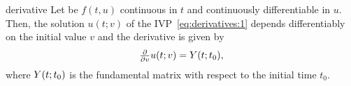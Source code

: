\begin{Theorem}{derivative}
   Let be $f(t,u)$ continuous in $t$ and
  continuously differentiable in $u$.  Then, the solution $u(t;v)$ of
  the IVP~\eqref{eq:derivatives:1} depends differentiably on the
  initial value $v$ and the derivative is given by
  \begin{gather}
    \label{eq:derivatives:5}
    \tfrac{\partial}{\partial v} u(t;v) = \fundamental(t;t_0),
  \end{gather}
  where $\fundamental(t;t_0)$ is the fundamental matrix with respect
  to the initial time $t_0$.
\end{Theorem}

